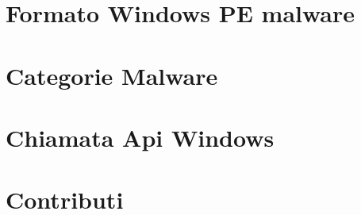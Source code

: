 \section{Formato Windows PE malware}


\section{Categorie Malware}



\section{Chiamata Api Windows}


\section{Contributi}

